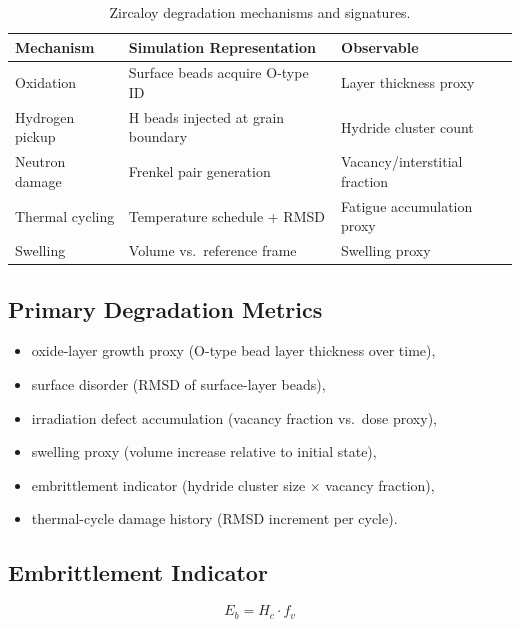 \documentclass[12pt]{article}
\begin{document}
\begin{table}[H]
\centering
\caption{Zircaloy degradation mechanisms and signatures.}
\label{tab:app_zircaloy}
\begin{tabular}{p{}p{}p{}}
\toprule
\textbf{Mechanism} & \textbf{Simulation Representation} & \textbf{Observable} \\
\midrule
Oxidation          & Surface beads acquire O-type ID    & Layer thickness proxy \\
Hydrogen pickup    & H beads injected at grain boundary & Hydride cluster count \\
Neutron damage     & Frenkel pair generation            & Vacancy/interstitial fraction \\
Thermal cycling    & Temperature schedule + RMSD        & Fatigue accumulation proxy \\
Swelling           & Volume vs.\ reference frame        & Swelling proxy \\
\bottomrule
\end{tabular}
\end{table}

\subsection{Primary Degradation Metrics}

\begin{itemize}[noitemsep]
	\item oxide-layer growth proxy (O-type bead layer thickness over time),
	\item surface disorder (RMSD of surface-layer beads),
	\item irradiation defect accumulation (vacancy fraction vs.\ dose proxy),
	\item swelling proxy (volume increase relative to initial state),
	\item embrittlement indicator (hydride cluster size $\times$ vacancy fraction),
	\item thermal-cycle damage history (RMSD increment per cycle).
\end{itemize}

\subsection{Embrittlement Indicator}

\begin{equation}
	E_b = H_c \cdot f_v
\end{equation}
\end{document}
